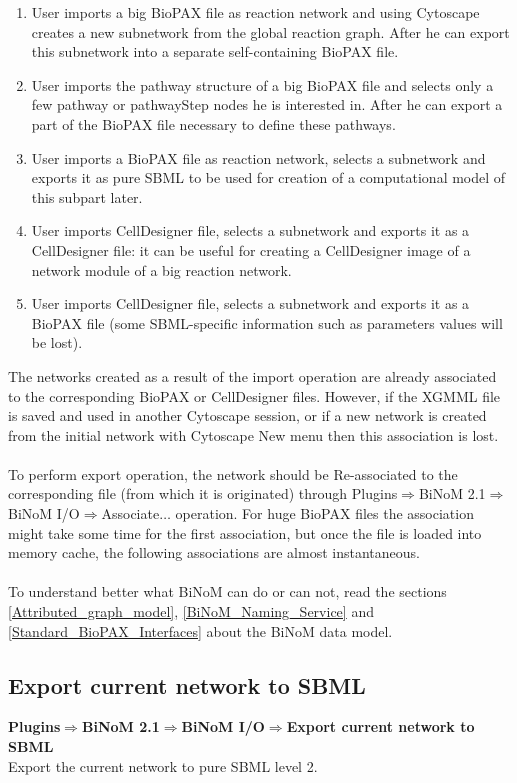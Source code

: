 \begin{enumerate}
\item User imports a big BioPAX file as reaction network and using Cytoscape creates a new subnetwork from the global reaction graph. After he can export this subnetwork into a separate self-containing BioPAX file.
\item User imports the pathway structure of a big BioPAX file and selects only a few pathway or pathwayStep nodes he is interested in. After he can export a part of the BioPAX file necessary to define these pathways.
\item User imports a BioPAX file as reaction network, selects a subnetwork and exports it as pure SBML to be used for creation of a computational model of this subpart later.
\item User imports CellDesigner file, selects a subnetwork and exports it as a CellDesigner file: it can be useful for creating a CellDesigner image of a network module of a big reaction network.
\item User imports CellDesigner file, selects a subnetwork and exports it as a BioPAX file (some SBML-specific information such as parameters values will be lost).
\end{enumerate}
The networks created as a result of the import operation are already associated to the corresponding BioPAX or CellDesigner files. However, if the XGMML file is saved and used in another Cytoscape session, or if a new network is created from the initial network with Cytoscape New menu then this association is lost.\\\\
To perform export operation, the network should be Re-associated to the corresponding file (from which it is originated) through Plugins$\Rightarrow$BiNoM 2.1$\Rightarrow$BiNoM I/O$\Rightarrow$Associate$\ldots$ operation. For huge BioPAX files the association might take some time for the first association, but once the file is loaded into memory cache, the following associations are almost instantaneous.\\\\
To understand better what BiNoM can do or can not, read the sections \ref{Attributed_graph_model}, \ref{BiNoM_Naming_Service} and \ref{Standard_BioPAX_Interfaces} about the BiNoM data model.

\subsection{Export current network to SBML}
\textbf{Plugins$\Rightarrow$BiNoM 2.1$\Rightarrow$BiNoM I/O$\Rightarrow$Export current network to SBML}\\
Export the current network to pure SBML level 2.

